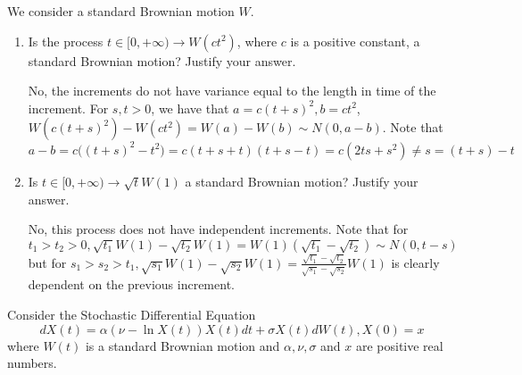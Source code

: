 \documentclass[12pt,twoside, letter]{exam}
\theoremstyle{definition}
\begin{document}
  \par{We consider a standard Brownian motion $W$.}

  \begin{enumerate}
    \item Is the process $t \in [0, +\infty) \rightarrow W(ct^2)$, where $c$ is a positive constant, a standard Brownian motion? Justify your answer.
      \begin{solution}
        No, the increments do not have variance equal to the length in time of the increment.
        For $s,t > 0$, we have that $a = c(t+s)^2, b = ct^2$, $W(c(t+s)^2) - W(ct^2) = W(a) - W(b) \sim N(0, a-b)$. Note that $a-b = c\bigg((t+s)^2 - t^2 \bigg)
        = c(t + s + t)(t + s - t) = c(2ts + s^2) \neq s = (t+s) - t$
      \end{solution}
    \item Is $t \in [0, +\infty) \rightarrow \sqrt{t}W(1)$ a standard Brownian motion? Justify your answer.
      \begin{solution}
        No, this process does not have independent increments. Note that for $t_1 > t_2 > 0, \sqrt{t_1}W(1) - \sqrt{t_2}W(1)
        = W(1)(\sqrt{t_1} - \sqrt{t_2}) \sim N(0, t - s)$ but for $s_1 > s_2 > t_1, \sqrt{s_1}W(1) - \sqrt{s_2}W(1) = \frac{\sqrt{t_1} - \sqrt{t_2}}
        {\sqrt{s_1} - \sqrt{s_2}}W(1)$ is clearly dependent on the previous increment.
      \end{solution}
  \end{enumerate}

  \par{Consider the Stochastic Differential Equation}
    \begin{equation*}
      dX(t) = \alpha (\nu - \ln{X(t)})X(t)dt + \sigma X(t) dW(t), X(0)=x
    \end{equation*}
  where $W(t)$ is a standard Brownian motion and $\alpha, \nu, \sigma$ and $x$ are positive real numbers.
\end{document}
